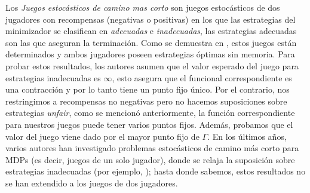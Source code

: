 

















Los \emph{Juegos estocásticos de camino mas corto} \cite{PatekBertsekas99} son juegos estocásticos de dos jugadores con recompensas (negativas o positivas) en los que las estrategias del minimizador se clasifican en \emph{adecuadas} e \emph{inadecuadas},
las estrategias adecuadas son las que aseguran la terminación. Como se demuestra en \cite{PatekBertsekas99}, estos juegos están determinados y ambos jugadores poseen estrategias óptimas sin memoria. Para probar estos resultados, los autores asumen que el valor esperado del juego para estrategias inadecuadas es $\infty$, esto asegura que el funcional correspondiente es una contracción y por lo tanto tiene un punto fijo único. Por el contrario, nos restringimos a recompensas no negativas pero no hacemos suposiciones sobre estrategias \textit{unfair}, como se mencionó anteriormente, la función correspondiente para nuestros juegos puede tener varios puntos fijos. Además, probamos que el valor del juego viene dado por el mayor punto fijo de $\Gamma$. En los últimos años, varios autores han investigado problemas estocásticos de camino más corto para MDPs (es decir, juegos de un solo jugador), donde se relaja la suposición sobre estrategias inadecuadas (por ejemplo, \cite{DBLP:conf/lics/Baier0DGS18}); hasta donde sabemos, estos resultados no se han extendido a los juegos de dos jugadores.

	
